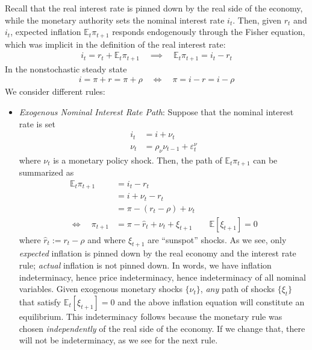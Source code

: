\documentclass[12pt]{article}
\theoremstyle{plain}
\theoremstyle{definition}
\theoremstyle{remark}
\newcommand{\E}{\mathbb{E}}
\begin{document}
Recall that the real interest rate is pinned down by the real side of
the economy, while the monetary authority sets the nominal interest rate
$i_t$. Then, given $r_t$ and $i_t$, expected inflation $\E_t\pi_{t+1}$
responds endogenously through the Fisher equation, which was implicit in
the definition of the real interest rate:
\begin{align*}
  i_t = r_t + \E_t\pi_{t+1}
  \quad\implies\quad
  \E_t\pi_{t+1} = i_t - r_t
\end{align*}
In the nonstochastic steady state
\begin{align*}
  i = \pi + r = \pi + \rho
  \quad\iff\quad
  \pi = i - r = i - \rho
\end{align*}
We consider different rules:
\begin{itemize}
  \item \emph{Exogenous Nominal Interest Rate Path}: Suppose that the
    nominal interest rate is set
    \begin{align*}
      i_t &= i + \nu_t
      \\
      \nu_t &= \rho_\nu \nu_{t-1}+\varepsilon_t^\nu
    \end{align*}
    where $\nu_t$ is a monetary policy shock. Then, the path of
    $\E_t\pi_{t+1}$ can be summarized as
    \begin{align*}
      \E_t\pi_{t+1} &= i_t - r_t
      \\
      &= i + \nu_t - r_t \\
      &= \pi - (r_t-\rho) + \nu_t \\
      \iff\quad
      \pi_{t+1}
      &= \pi - \hat{r}_t + \nu_t  + \xi_{t+1}
      \qquad \E[\xi_{t+1}]=0
    \end{align*}
    where $\hat{r}_t:=r_t-\rho$ and where $\xi_{t+1}$ are ``sunspot''
    shocks. As we see, only \emph{expected} inflation is pinned down by
    the real economy and the interest rate rule; \emph{actual} inflation
    is not pinned down. In words, we have inflation indeterminacy, hence
    price indeterminacy, hence indeterminacy of all nominal variables.
    Given exogenous monetary shocks $\{\nu_t\}$, \emph{any} path of
    shocks $\{\xi_t\}$ that satisfy $\E_t[\xi_{t+1}]=0$ and the above
    inflation equation will constitute an equilibrium.
    This indeterminacy follows because the monetary rule was chosen
    \emph{independently} of the real side of the economy. If we change
    that, there will not be indeterminacy, as we see for the next rule.


\end{itemize}
\end{document}
